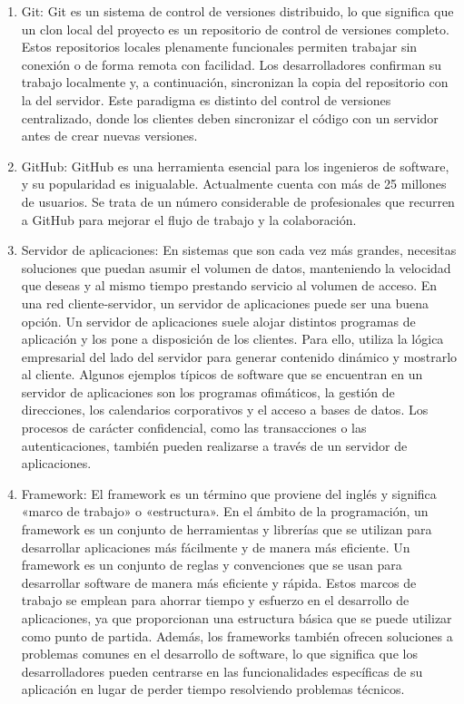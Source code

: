 \begin{enumerate}
    \item Git: Git es un sistema de control de versiones distribuido, lo que significa que un clon local del proyecto es un repositorio de control de versiones completo. Estos repositorios locales plenamente funcionales permiten trabajar sin conexión o de forma remota con facilidad. Los desarrolladores confirman su trabajo localmente y, a continuación, sincronizan la copia del repositorio con la del servidor. Este paradigma es distinto del control de versiones centralizado, donde los clientes deben sincronizar el código con un servidor antes de crear nuevas versiones.\citep{microsoftQuGit}
    \item GitHub: GitHub es una herramienta esencial para los ingenieros de software, y su popularidad es inigualable. Actualmente cuenta con más de 25 millones de usuarios. Se trata de un número considerable de profesionales que recurren a GitHub para mejorar el flujo de trabajo y la colaboración.\citep{hostingerGitHubCmo}
    \item Servidor de aplicaciones: En sistemas que son cada vez más grandes, necesitas soluciones que puedan asumir el volumen de datos, manteniendo la velocidad que deseas y al mismo tiempo prestando servicio al volumen de acceso. En una red cliente-servidor, un servidor de aplicaciones puede ser una buena opción. Un servidor de aplicaciones suele alojar distintos programas de aplicación y los pone a disposición de los clientes. Para ello, utiliza la lógica empresarial del lado del servidor para generar contenido dinámico y mostrarlo al cliente. Algunos ejemplos típicos de software que se encuentran en un servidor de aplicaciones son los programas ofimáticos, la gestión de direcciones, los calendarios corporativos y el acceso a bases de datos. Los procesos de carácter confidencial, como las transacciones o las autenticaciones, también pueden realizarse a través de un servidor de aplicaciones.\citep{ionosQuServidores}
    \item Framework: El framework es un término que proviene del inglés y significa «marco de trabajo» o «estructura». En el ámbito de la programación, un framework es un conjunto de herramientas y librerías que se utilizan para desarrollar aplicaciones más fácilmente y de manera más eficiente. 
    Un framework es un conjunto de reglas y convenciones que se usan para desarrollar software de manera más eficiente y rápida. Estos marcos de trabajo se emplean para ahorrar tiempo y esfuerzo en el desarrollo de aplicaciones, ya que proporcionan una estructura básica que se puede utilizar como punto de partida. Además, los frameworks también ofrecen soluciones a problemas comunes en el desarrollo de software, lo que significa que los desarrolladores pueden centrarse en las funcionalidades específicas de su aplicación en lugar de perder tiempo resolviendo problemas técnicos.\citep{cesumaQuFramework}

\end{enumerate}
